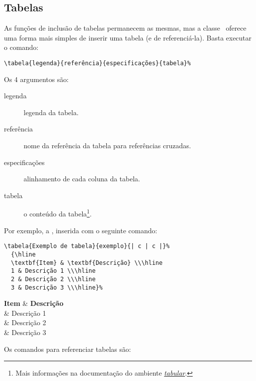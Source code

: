 %


\subsection{Tabelas}
As funções de inclusão de tabelas permanecem as mesmas, mas a classe \unbcic\
oferece uma forma mais simples de inserir uma tabela (e de referenciá-la). Basta
executar o comando:

\begin{verbatim}
\tabela{legenda}{referência}{especificações}{tabela}%
\end{verbatim}

Os 4 argumentos são:
\begin{description}
\item[legenda] legenda da tabela.
\item[referência] nome da referência da tabela para referências cruzadas.
\item[especificações] alinhamento de cada coluna da tabela.
\item[tabela] o conteúdo da tabela\footnote{Mais informações na documentação do
ambiente \emph{\href{http://en.wikibooks.org/wiki/LaTeX/Tables}{tabular}}.}.
\end{description}

Por exemplo, a , inserida com o seguinte comando:
\begin{verbatim}
\tabela{Exemplo de tabela}{exemplo}{| c | c |}%
  {\hline
  \textbf{Item} & \textbf{Descrição} \\\hline
  1 & Descrição 1 \\\hline
  2 & Descrição 2 \\\hline
  3 & Descrição 3 \\\hline}%
\end{verbatim}

%
  {\hline
  \textbf{Item} & \textbf{Descrição} \\ & Descrição 1 \\ & Descrição 2 \\ & Descrição 3 \\\hline}%

Os comandos para referenciar tabelas são:

